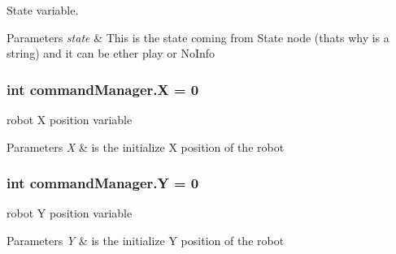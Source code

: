 State variable. 


\begin{DoxyParams}{Parameters}
{\em state} & This is the state coming from State node (that\textquotesingle{}s why is a string) and it can be ether play or No\+Info \\
\hline
\end{DoxyParams}
\subsubsection[{\texorpdfstring{X}{X}}]{\setlength{\rightskip}{0pt plus 5cm}int command\+Manager.\+X = 0}\hypertarget{namespacecommandManager_af232742df3203418fc63619d6fdbbd7d}{}\label{namespacecommandManager_af232742df3203418fc63619d6fdbbd7d}


robot X position variable 


\begin{DoxyParams}{Parameters}
{\em X} & is the initialize X position of the robot \\
\hline
\end{DoxyParams}
\subsubsection[{\texorpdfstring{Y}{Y}}]{\setlength{\rightskip}{0pt plus 5cm}int command\+Manager.\+Y = 0}\hypertarget{namespacecommandManager_a724d5ba6dbd057b575e254a1abbb8b63}{}\label{namespacecommandManager_a724d5ba6dbd057b575e254a1abbb8b63}


robot Y position variable 


\begin{DoxyParams}{Parameters}
{\em Y} & is the initialize Y position of the robot \\
\hline
\end{DoxyParams}
